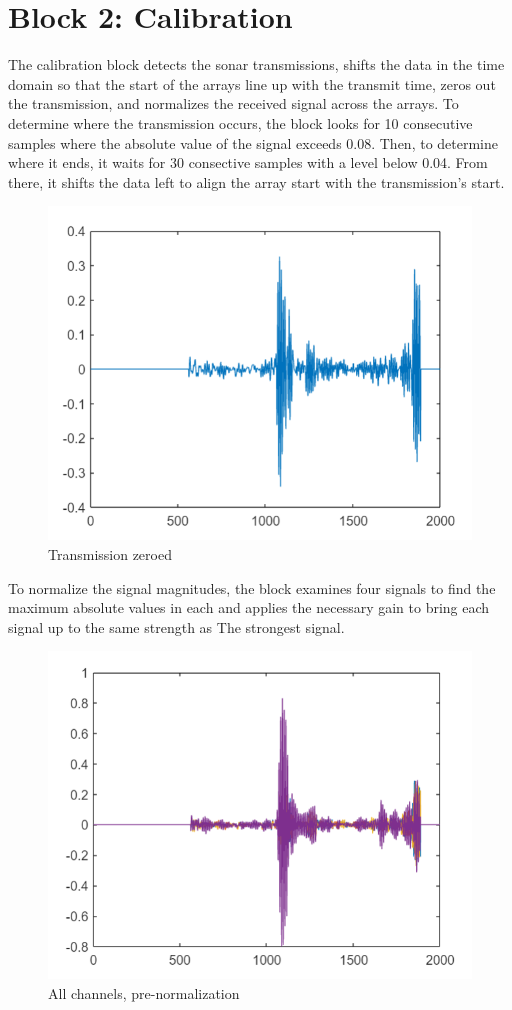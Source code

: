 
\section{Block 2: Calibration}

The calibration block detects the sonar transmissions, shifts the data in the time domain so that the start
 of the arrays line up with the transmit time, zeros out the transmission, and normalizes the received signal
 across the arrays. To determine where the transmission occurs, the block looks for 10 consecutive samples where
 the absolute value of the signal exceeds 0.08. Then, to determine where it ends, it waits for 30 consective
 samples with a level below 0.04. From there, it shifts the data left to align the array start with the
 transmission's start.
 
\begin{figure}[H]
    \centering
    \includegraphics[width=0.5\linewidth]{figures/tx_zero.PNG}
    \caption{Transmission zeroed}
\end{figure}
 
 To normalize the signal magnitudes, the block examines four signals to find the maximum
 absolute values in each and applies the necessary gain to bring each signal up to the same strength as The
 strongest signal.

\begin{figure}[H]
    \centering
    \includegraphics[width=0.5\linewidth]{figures/all_channels.PNG}
    \caption{All channels, pre-normalization}
\end{figure}

